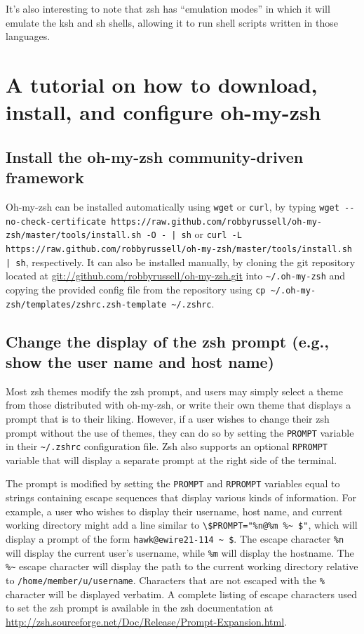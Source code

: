 \documentclass[12pt,a4paper]{article}
\begin{document}
		It's also interesting to note that zsh has ``emulation modes'' in which it will emulate the ksh and sh shells, allowing it to run shell scripts written in those languages.

	\section{A tutorial on how to download, install, and configure oh-my-zsh}
		\subsection{Install the oh-my-zsh community-driven framework}

			Oh-my-zsh can be installed automatically using \lstinline{wget} or \lstinline{curl}, by typing \lstinline{wget --no-check-certificate https://raw.github.com/robbyrussell/oh-my-zsh/master/tools/install.sh -O - | sh} or \lstinline{curl -L https://raw.github.com/robbyrussell/oh-my-zsh/master/tools/install.sh | sh}, respectively. It can also be installed manually, by cloning the git repository located at \url{git://github.com/robbyrussell/oh-my-zsh.git} into \verb!~/.oh-my-zsh! and copying the provided config file from the repository using \verb!cp ~/.oh-my-zsh/templates/zshrc.zsh-template ~/.zshrc!.

		\subsection{Change the display of the zsh prompt (e.g., show the user name and host name)}

			Most zsh themes modify the zsh prompt, and users may simply select a theme from those distributed with oh-my-zsh, or write their own theme that displays a prompt that is to their liking. However, if a user wishes to change their zsh prompt without the use of themes, they can do so by setting the \lstinline{PROMPT} variable in their \verb!~/.zshrc! configuration file. Zsh also supports an optional \lstinline{RPROMPT} variable that will display a separate prompt at the right side of the terminal.

			The prompt is modified by setting the \lstinline{PROMPT} and \lstinline{RPROMPT} variables equal to strings containing escape sequences that display various kinds of information. For example, a user who wishes to display their username, host name, and current working directory might add a line similar to \verb!\$PROMPT="%n@%m %~ $"!, which will display a prompt of the form \lstinline{hawk@ewire21-114 ~ $}. The escape character \lstinline{%n} will display the current user's username, while \lstinline{%m} will display the hostname. The \verb!%~! escape character will display the path to the current working directory relative to \verb!/home/member/u/username!. Characters that are not escaped with the \lstinline{%} character will be displayed verbatim. A complete listing of escape characters used to set the zsh prompt is available in the zsh documentation at \\\url{http://zsh.sourceforge.net/Doc/Release/Prompt-Expansion.html}.
\end{document}
